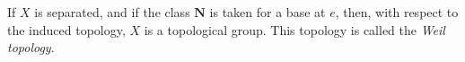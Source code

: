 If $X$ is separated, and if the class $\mathbf{N}$ is taken for a base at $e$, then, with respect to the induced topology, $X$ is a topological group. This topology is called the \emph{Weil topology}.